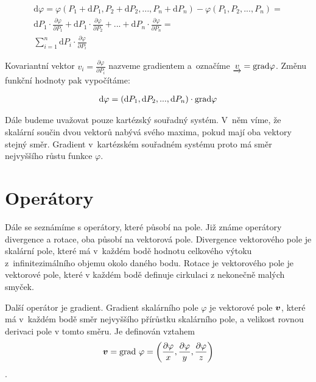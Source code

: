 \begin{equation}
\begin{split}
\mathrm{d} \varphi = \varphi(P_1 + \mathrm{d}P_1, P_2 + \mathrm{d}P_2, ..., P_n + \mathrm{d}P_n) - \varphi(P_1, P_2, ..., P_n) = \\
\mathrm{d}P_1 \cdot \frac{\partial \varphi}{\partial P_1} + \mathrm{d}P_1 \cdot \frac{\partial \varphi}{\partial P_2} +
... + \mathrm{d}P_n \cdot \frac{\partial \varphi}{\partial P_n} = \\
\sum_{i=1}^n \mathrm{d}P_i \cdot \frac{\partial \varphi}{\partial P_i}
\end{split}
\end{equation}

Kovariantní vektor \(v_i = \frac{\partial \varphi}{\partial P_i}\) nazveme gradientem a~označíme \(\underrightarrow{v} = \mathrm{grad}{\varphi}\). Změnu funkční hodnoty pak vypočítáme:

\begin{equation}
\label{eq:zmena_pole_gradient}
\begin{split}
\mathrm{d}\varphi = (\mathrm{d}P_1, \mathrm{d}P_2, ..., \mathrm{d}P_n) \cdot \mathrm{grad}{\varphi} 
\end{split}
\end{equation}

Dále budeme uvažovat pouze kartézský souřadný systém. V~něm víme, že skalární součin dvou vektorů nabývá svého maxima, pokud
mají oba vektory stejný směr. Gradient v~kartézském souřadném systému proto má směr nejvyššího růstu funkce \(\varphi\).



\section{Operátory}

Dále se seznámíme s operátory, které působí na pole. Již známe operátory divergence a rotace, oba působí na vektorová pole. Divergence vektorového pole
je skalární pole, které má v~každém bodě hodnotu celkového výtoku z~infinitezimálního objemu okolo daného bodu. Rotace je vektorového pole je vektorové
pole, které v každém bodě definuje cirkulaci z nekonečně malých smyček.

Další operátor je gradient. Gradient skalárního pole \(\varphi\) je vektorové pole \(\boldsymbol{v}\), které má v~každém bodě směr nejvyššího přírůstku skalárního pole, a velikost rovnou derivaci pole v tomto směru. Je definován vztahem
\[
\boldsymbol{v} = \mathrm{grad} \ \varphi = \left(\frac{\partial \varphi}{x}, \frac{\partial \varphi}{y}, \frac{\partial \varphi}{z}\right)
\].

